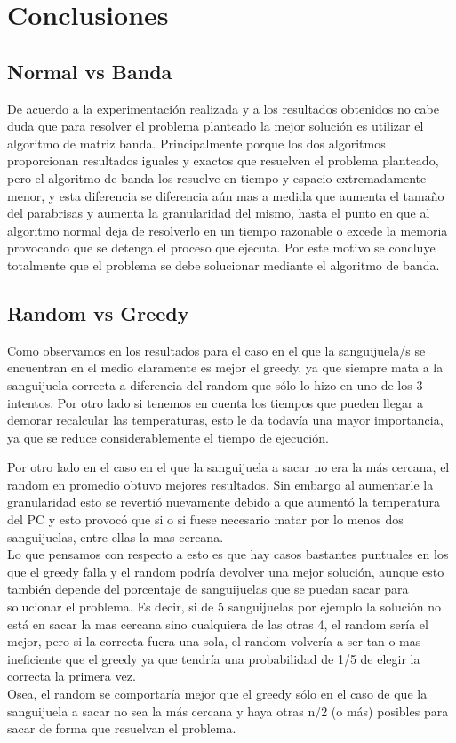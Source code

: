 \section{Conclusiones}

\subsection{Normal vs Banda}

De acuerdo a la experimentación realizada y a los resultados obtenidos no cabe duda que para resolver el problema planteado la mejor solución es utilizar el algoritmo de matriz banda. Principalmente porque los dos algoritmos proporcionan resultados iguales y exactos que resuelven el problema planteado, pero el algoritmo de banda los resuelve en tiempo y espacio extremadamente menor, y esta diferencia se diferencia aún mas a medida que aumenta el tamaño del parabrisas y aumenta la granularidad del mismo, hasta el punto en que al algoritmo normal deja de resolverlo en un tiempo razonable o excede la memoria provocando que se detenga el proceso que ejecuta. Por este motivo se concluye totalmente que el problema se debe solucionar mediante el algoritmo de banda.

\subsection{Random vs Greedy}

Como observamos en los resultados para el caso en el que la sanguijuela/s se encuentran en el medio claramente es mejor el greedy, ya que siempre mata a la sanguijuela correcta a diferencia del random que sólo lo hizo en uno de los 3 intentos. Por otro lado si tenemos en cuenta los tiempos que pueden llegar a demorar recalcular las temperaturas, esto le da todavía una mayor importancia, ya que se reduce considerablemente el tiempo de ejecución.

Por otro lado en el caso en el que la sanguijuela a sacar no era la más cercana, el random en promedio obtuvo mejores resultados. Sin embargo al aumentarle la granularidad esto se revertió nuevamente debido a que aumentó la temperatura del PC y esto provocó que si o si fuese necesario matar por lo menos dos sanguijuelas, entre ellas la mas cercana. \\
Lo que pensamos con respecto a esto es que hay casos bastantes puntuales en los que el greedy falla y el random podría devolver una mejor solución, aunque esto también depende del porcentaje de sanguijuelas que se puedan sacar para solucionar el problema. Es decir, si de 5 sanguijuelas por ejemplo la solución no está en sacar la mas cercana sino cualquiera de las otras 4, el random sería el mejor, pero si la correcta fuera una sola, el random volvería a ser tan o mas ineficiente que el greedy ya que tendría una probabilidad de 1/5 de elegir la correcta la primera vez.\\
Osea, el random se comportaría mejor que el greedy sólo en el caso de que la sanguijuela a sacar no sea la más cercana y haya otras n/2 (o más) posibles para sacar de forma que resuelvan el problema.


